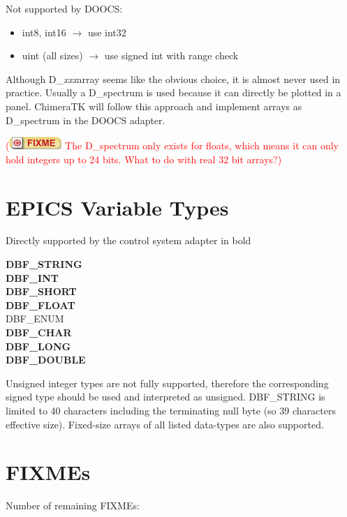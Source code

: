 \documentclass[11pt,a4paper]{scrartcl}
\newcounter{nFixmes}
\newcommand{\fixme}[1]{\addtocounter{nFixmes}{1}\textcolor{red}{(\includegraphics[height=2ex]{fixme} #1)}\xspace}
\begin{document}
Not supported by DOOCS:
\begin{itemize}
\item int8, int16 $\rightarrow$ use int32
\item uint (all sizes) $\rightarrow$ use signed int with range check
\end{itemize}

Although D\_\textit{xxx}array seems like the obvious choice, it is almost never used in practice.
Usually a D\_spectrum is used because it can directly be plotted in a panel. ChimeraTK
will follow this approach and implement arrays as D\_spectrum in the DOOCS adapter.
\fixme{The D\_spectrum only exists for floats, which means it can only hold integers up to 24 bits. What to do with real 32 bit arrays?}

\section{EPICS Variable Types}
Directly supported by the control system adapter in bold
\begin{multicols}{3}
\noindent \textbf{DBF\_STRING}\\
\textbf{DBF\_INT}\\
\textbf{DBF\_SHORT}\\
\textbf{DBF\_FLOAT}\\
DBF\_ENUM\\
\textbf{DBF\_CHAR}\\
\textbf{DBF\_LONG}\\
\textbf{DBF\_DOUBLE}
\end{multicols}

Unsigned integer types are not fully supported, therefore the corresponding
signed type should be used and interpreted as unsigned. DBF\_STRING is
limited to 40 characters including the terminating null byte (so 39
characters effective size). Fixed-size arrays of all listed data-types
are also supported.

\section{FIXMEs}
Number of remaining FIXMEs: 
\end{document}
